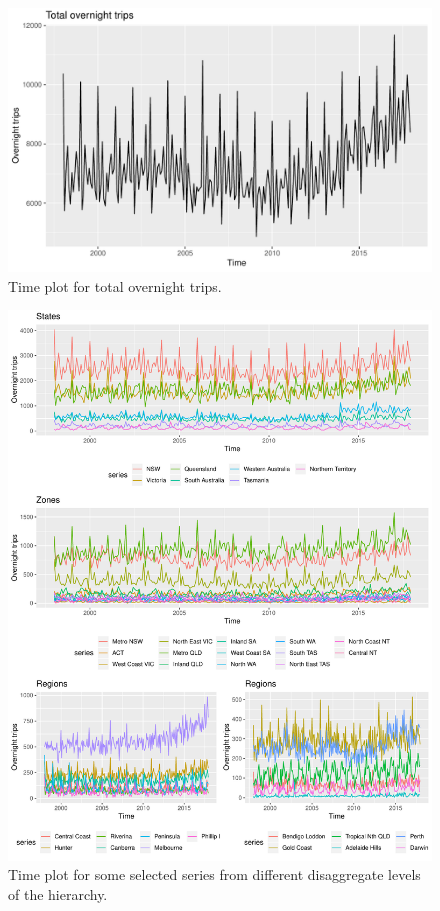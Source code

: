 \documentclass[12pt]{article}
\theoremstyle{definition}
\theoremstyle{property}
\begin{document}
	\begin{figure}
		\centering
		\small
		\includegraphics[width = \textwidth]{Empirical-results/TS-plots/Total_TSplot.pdf}
		\caption{Time plot for total overnight trips.}\label{fig:Total_TSplots}
	\end{figure}
	
	
	\begin{figure}
		\centering
		\small
		\includegraphics[width = \textwidth]{Empirical-results/TS-plots/States_Zones_Regs_TSplots.pdf}
		\caption{Time plot for some selected series from different disaggregate levels of the hierarchy.}\label{fig:States_Zones_Regs_TSplots}
	\end{figure}
\end{document}
